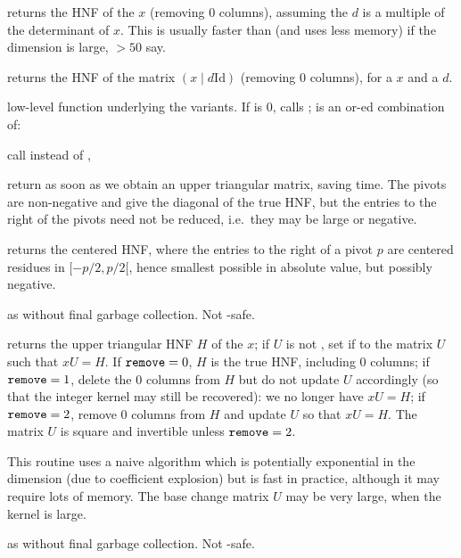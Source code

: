  returns the HNF of the  $x$
(removing $0$ columns), assuming the  $d$ is a multiple of the
determinant of $x$. This is usually faster than  (and uses less
memory) if the dimension is large, $> 50$ say.

 returns the HNF of the matrix $(x \mid d
\text{Id})$ (removing $0$ columns), for a  $x$ and a  $d$.

 low-level function
underlying the  variants. If  is $0$, calls
;  is an or-ed combination of:

\item {} call  instead of ,

\item {} return as soon as we obtain an upper triangular matrix,
saving time. The pivots are non-negative and give the diagonal of the true HNF,
but the entries to the right of the pivots need not be reduced, i.e.~they may be
large or negative.

\item {} returns the centered HNF, where the entries to the
right of a pivot $p$ are centered residues in $[-p/2, p/2[$, hence smallest
possible in absolute value, but possibly negative.

 as 
without final garbage collection. Not -safe.

 returns the upper triangular
HNF $H$ of the  $x$; if $U$ is not , set if to the matrix
$U$ such that $x U = H$. If ${\tt remove} = 0$, $H$ is the true HNF,
including $0$ columns; if ${\tt remove} = 1$, delete the $0$ columns from $H$
but do not update $U$ accordingly (so that the integer kernel may still be
recovered): we no longer have $x U = H$; if ${\tt remove} = 2$, remove $0$
columns from $H$ and update $U$ so that $x U = H$. The matrix $U$ is square
and invertible unless ${\tt remove} = 2$.

This routine uses a naive algorithm which is potentially exponential in the
dimension (due to coefficient explosion) but is fast in practice, although it
may require lots of memory. The base change matrix $U$ may be very large,
when the kernel is large.

 as  without
final garbage collection. Not -safe.

